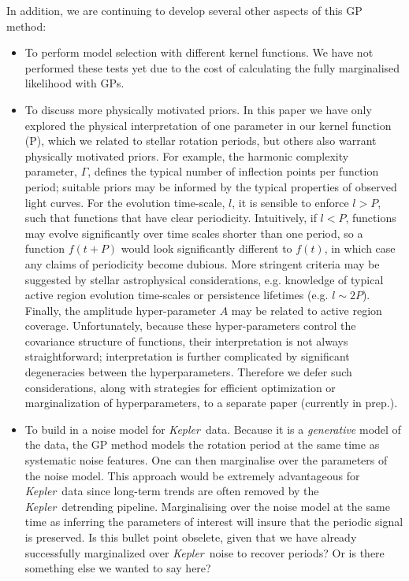 \documentclass[useAMS, usenatbib, preprint, 12pt]{aastex}
\newcommand{\Kepler}{{\it Kepler}}
\newcommand{\kepler}{\Kepler}
\newcommand{\tdmcomment}[1]{{\color{blue}#1}}
\begin{document}
In addition, we are continuing to develop several other aspects of this GP method:
\begin{itemize}
\item{To perform model selection with different kernel functions.
    We have not performed these tests yet due to the cost of calculating the
        fully marginalised likelihood with GPs.}
\item{To discuss more physically motivated priors.
        In this paper we have only explored the physical interpretation of one
        parameter in our kernel function (P), which we related to stellar
        rotation periods, but others also warrant physically motivated priors.
        For example, the harmonic complexity parameter, $\Gamma$, defines the
        typical number of inflection points per function period; suitable
        priors may be informed by the typical properties of observed light
        curves.
        For the evolution time-scale, $l$,  it is sensible to enforce $l > P$,
        such that functions that have clear periodicity.
        Intuitively, if $l < P$, functions may evolve significantly over time
        scales shorter than one period, so a function $f(t+P)$ would look
        significantly different to $f(t)$, in which case any claims of
        periodicity become dubious.
        More stringent criteria may be suggested by stellar astrophysical
        considerations, e.g. knowledge of typical active region evolution
        time-scales or persistence lifetimes (e.g. $l\sim2P$).
        Finally, the amplitude hyper-parameter $A$ may be related to active
        region coverage.
        Unfortunately, because these hyper-parameters control the covariance
        structure of functions, their interpretation is not always
        straightforward; interpretation is further complicated by significant
        degeneracies between the hyperparameters.
        Therefore we defer such considerations, along with strategies for
        efficient optimization or marginalization of hyperparameters, to a
        separate paper (currently in prep.).
    }
\item{To build in a noise model for \kepler\ data.
Because it is a {\it generative} model of the data,
the GP method models the rotation period at the same time as systematic
noise features.
One can then marginalise over the parameters of the noise model.
This approach would be extremely advantageous for \kepler\ data since
long-term trends are often removed by the \kepler\ detrending pipeline.
Marginalising over the noise model at the same time as inferring the
parameters of interest will insure that the periodic signal is preserved.
\tdmcomment{Is this bullet point obselete, given that we have already successfully
marginalized over \kepler\ noise to recover periods? Or is there
something else we wanted to say here?}}
\end{itemize}
\end{document}
